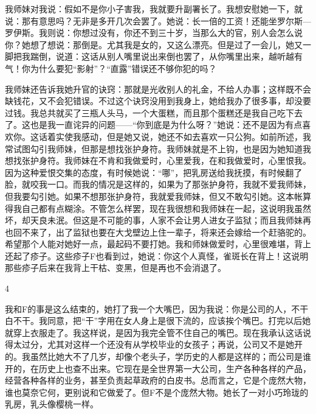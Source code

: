 我师妹对我说：假如不是你小子害我，我就要升副署长了。我想安慰她一下，就说：那有意思吗？无非是多开几次会罢了。她说：长一倍的工资！还能坐罗尔斯—罗伊斯。我则说：你想过没有，你还不到三十岁，当那么大的官，别人会怎么说你？她想了想说：那倒是。尤其我是女的，又这么漂亮。但是过了一会儿，她又一脚把我踹倒，说道：这话从别人嘴里说出来倒也罢了，从你嘴里出来，越听越有气！你为什么要犯“影射”？“直露”错误还不够你犯的吗？ 

我师妹还告诉我她升官的诀窍：那就是光收别人的礼金，不给人办事；这样既不会缺钱花，又不会犯错误。不过这个诀窍没用到我身上，她给我办了很多事，却没要过钱。我总共就买了三瓶人头马，一个大蛋糕，而且那个蛋糕还是我自己吃下去了。这也是我一直诧异的问题——“你到底是为什么呀？”她说：还不是因为有点喜欢你。这话着实使我感动，但是她又说，她还不如去喜欢一只公狗。如前所述，我常试图勾引我师妹，但那是想找张护身符。我师妹就是不上钩，也是因为她知道我想找张护身符。我师妹在不肯和我做爱时，心里爱我，在和我做爱时，心里恨我。因为这种爱恨交集的态度，有时候她说：“哪”，把乳房送给我抚摸，有时候翻了脸，就咬我一口。而我的情况是这样的，如果为了那张护身符，我就不爱我师妹，但我要勾引她。如果不想那张护身符，我就爱我师妹，但又不敢勾引她。这本帐算得我自己都有点糊涂。不管怎么样罢，现在我很想和我师妹在一起，这说明我虽然坏，却天良未泯。但这是不可能的事，人家不会让男人进女子监狱；而且我师妹再也回不来了，出了监狱也要在大戈壁边上住一辈子，将来还会嫁给一个赶骆驼的。希望那个人能对她好一点，最起码不要打她。我和师妹做爱时，心里很难堪，背上还起了疹子。这些疹子F也看到过，她说：你这个人真怪，雀斑长在背上！这说明那些疹子后来在我背上干枯、变黑，但是再也不会消退了。 

4 

我和F的事是这么结束的，她打了我一个大嘴巴，因为我说：你是公司的人，不干白不干。我同意，把“干”字用在女人身上是很下流的，应该挨个嘴巴。打完以后她就穿上衣服走了。我这样说，是因为我完全管不住自己的嘴巴。现在我承认这话说得太过分，尤其对这样一个还没有从学校毕业的女孩子；再说，公司又不是她开的。我虽然比她大不了几岁，却像个老头子，学历史的人都是这样的；而公司是谁开的，在历史上也查不出来。它现在是全世界第一大公司，生产各种各样的产品，经营各种各样的业务，甚至负责起草政府的白皮书。总而言之，它是个庞然大物，谁也莫奈它何，更别说和它做爱了。但F不是个庞然大物。她长了一对小巧玲珑的乳房，乳头像樱桃一样。 

